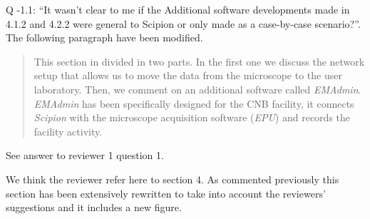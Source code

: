 \documentclass[a4paper,12pt]{article}
\def\cnb{CNB\xspace}
\def\scipion{\textit{Scipion}\xspace}
\def\emadmin{\textit{EMAdmin}\xspace}
\def\epu{\textit{EPU}\xspace}
\def\cnb{CNB\xspace}
\begin{document}
\begin{reviewer}
Q \the\numexpr\value{pointcounter}-1\relax.1: ``It wasn't clear to me if the Additional software developments made in 4.1.2 and 4.2.2 were general to Scipion or only made as a case-by-case scenario?''. The following paragraph have been modified.

\begin{quote}
 This section in divided in two parts. In the first one we discuss the network setup that allows us to move the data from the microscope to the user laboratory. Then,  we comment on an additional software called  \emadmin. \emadmin has been specifically designed for the \cnb facility, it connects \scipion with the microscope acquisition software (\epu) and records the facility activity.
\end{quote}



\reply See answer to reviewer 1 question 1. 


\reply We think the reviewer refer here to section 4. As commented previously this section has been extensively rewritten to take into account the reviewers' suggestions and it includes a new figure.

\end{reviewer}
\end{document}
